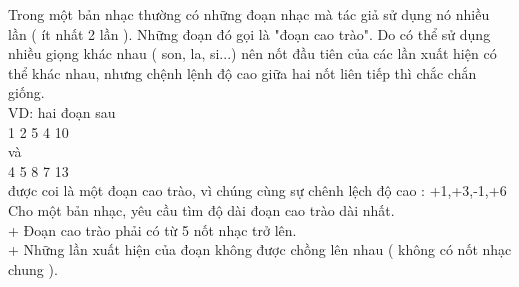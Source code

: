 Trong một bản nhạc thường có những đoạn nhạc mà tác giả sử dụng nó nhiều lần ( ít nhất 2 lần ). Những đoạn đó gọi là "đoạn cao trào". Do có thể sử dụng nhiều giọng khác nhau ( son, la, si...) nên nốt đầu tiên của các lần xuất hiện có thể khác nhau, nhưng chệnh lệnh độ cao giữa hai nốt liên tiếp thì chắc chắn giống.   
\\   VD: hai đoạn sau   
\\   1 2 5 4 10   
\\   và   
\\   4 5 8 7 13   
\\   được coi là một đoạn cao trào, vì chúng cùng sự chênh lệch độ cao : +1,+3,-1,+6   
\\   Cho một bản nhạc, yêu cầu tìm độ dài đoạn cao trào dài nhất.   
\\   + Đoạn cao trào phải có từ 5 nốt nhạc trở lên.   
\\   + Những lần xuất hiện của đoạn không được chồng lên nhau ( không có nốt nhạc chung ).   
\\